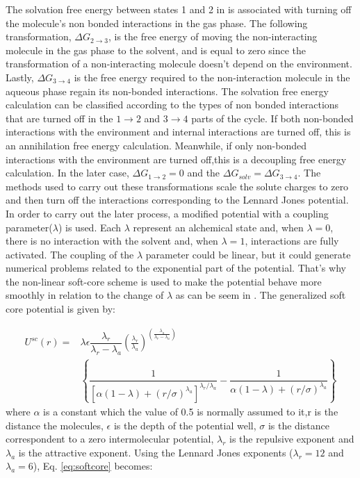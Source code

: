 The solvation free energy between states 1 and 2 in  is associated with turning off the molecule's non bonded interactions in the gas phase. The following transformation, $\Delta G_{2 \rightarrow 3}$, is the free energy of moving the non-interacting molecule in the gas phase to the solvent, and is equal to zero since the transformation of a non-interacting molecule doesn't depend on the environment. Lastly, $\Delta G_{3 \rightarrow 4}$ is the free energy required to the non-interaction molecule in the aqueous phase regain its non-bonded interactions.  The solvation free energy calculation can be classified according to the types of non bonded interactions that are turned off in the $1 \rightarrow 2$ and $ 3 \rightarrow 4$ parts of the cycle. If both non-bonded interactions with the environment and internal interactions are turned off, this is an annihilation free energy calculation. Meanwhile, if only non-bonded interactions with the environment are turned off,this is a decoupling free energy calculation. In the later case, $\Delta G_{1 \rightarrow 2} = 0$ and the $\Delta G_{solv} = \Delta G_{3 \rightarrow 4} $. The methods used to carry out these transformations scale the solute charges to zero and then turn off the interactions corresponding to the Lennard Jones potential. In order to carry out the later process, a modified potential with a coupling parameter($\lambda$) is used. Each $\lambda$ represent an alchemical state and, when $\lambda=0$, there is no interaction with the solvent and, when $\lambda=1$, interactions are fully activated. The coupling of the $\lambda$ parameter could be linear, but it could generate numerical problems related to the exponential part of the potential.  That's why the non-linear soft-core scheme \cite{beutler1994} is used to make the potential behave more smoothly in relation to the change of $\lambda$ as can be seem in . The generalized soft core potential is given by:

\begin{equation}
\label{eq:softcore}
\begin{aligned}
U^{sc}(r) {}=& \lambda\epsilon\dfrac{\lambda_r}{\lambda_r - \lambda_a} \left(\frac{\lambda_r}{\lambda_a} \right)^{\left( \frac{\lambda_a}{\lambda_r - \lambda_a} \right)} \\
& \left\lbrace\dfrac{1}{\left[\alpha(1-\lambda)+ (r/\sigma)^{\lambda_a}\right]^{\lambda_{r}/\lambda_{a}}} - \dfrac{1}{\alpha(1-\lambda)+(r/\sigma)^{\lambda_a}}\right\rbrace
\end{aligned}
\end{equation}
where $\alpha$ is a constant which the value of 0.5 is normally assumed to it,r is the distance the molecules, $\epsilon$ is the depth of the potential well, $\sigma$ is the distance correspondent to a zero intermolecular potential, $\lambda_r$ is the repulsive exponent and $\lambda_a$ is the attractive exponent. Using the Lennard Jones exponents ($\lambda _{r} =12$ and $\lambda _{a} = 6$), Eq. \eqref{eq:softcore} becomes:

